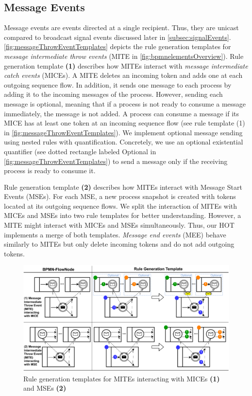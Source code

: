 \documentclass{lmcs} %
\begin{document}
\subsection{Message Events}
Message events are events directed at a single recipient.
Thus, they are unicast compared to broadcast signal events discussed later in \autoref{subsec:signalEvents}.
\autoref{fig:messageThrowEventTemplates} depicts the rule generation templates for \textit{message intermediate throw events} (\textsf{MITE} in \autoref{fig:bpmnelementsOverview}).
Rule generation template \textbf{(1)} describes how MITEs interact with \textit{message intermediate catch events} (MICEs).
A MITE deletes an incoming token and adds one at each outgoing sequence flow.
In addition, it sends one message to each process by adding it to the incoming messages of the process.
However, sending each message is optional, meaning that if a process is not ready to consume a message immediately, the message is not added.
A process can consume a message if its MICE has at least one token at an incoming sequence flow (see rule template (1) in \autoref{fig:messageThrowEventTemplates}).
We implement optional message sending using nested rules with quantification.
Concretely, we use an optional existential quantifier \cite{rensinkNestedQuantificationGraph2006} (see dotted rectangle labeled \textsf{Optional} in \autoref{fig:messageThrowEventTemplates}) to send a message only if the receiving process is ready to consume it.

Rule generation template \textbf{(2)} describes how MITEs interact with Message Start Events (MSEs).
For each MSE, a new process snapshot is created with tokens located at its outgoing sequence flows.
We split the interaction of MITEs with MICEs and MSEs into two rule templates for better understanding.
However, a MITE might interact with MICEs and MSEs simultaneously.
Thus, our HOT implements a merge of both templates. 
\textit{Message end events} (\textsf{MEE}) behave similarly to MITEs but only delete incoming tokens and do not add outgoing tokens.

\begin{figure}[ht]
    \centering
    \includegraphics[width=1\textwidth]{images/mite_template.pdf}
    \caption{Rule generation templates for MITEs interacting with MICEs \textbf{(1)} and MSEs \textbf{(2)}}
    \label{fig:messageThrowEventTemplates}
\end{figure}
\end{document}
